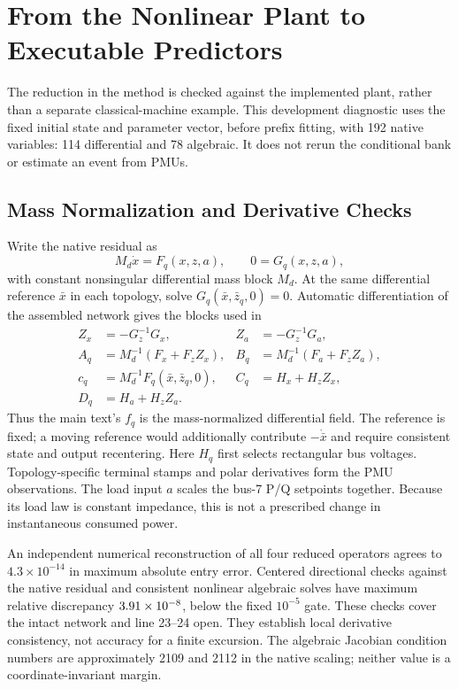 \section{From the Nonlinear Plant to Executable Predictors}
\label{app:descriptor-bridge}


The reduction in the method is checked against the implemented plant,
rather than a separate classical-machine example. This development
diagnostic uses the fixed initial state and parameter vector, before
prefix fitting, with 192 native variables: 114 differential and 78 algebraic.
It does not rerun the conditional bank or estimate an event from PMUs.

\subsection{Mass Normalization and Derivative Checks}
Write the native residual as
\begin{equation}
 M_d\dot x=F_q(x,z,a),\qquad 0=G_q(x,z,a),
\end{equation}
with constant nonsingular differential mass block $M_d$. At the same
differential reference $\bar x$ in each topology, solve
$G_q(\bar x,\bar z_q,0)=0$. Automatic differentiation of the assembled
network gives the blocks used in
\begin{align}
 Z_x&=-G_z^{-1}G_x,&Z_a&=-G_z^{-1}G_a,\nonumber\\
 A_q&=M_d^{-1}(F_x+F_zZ_x),&
 B_q&=M_d^{-1}(F_a+F_zZ_a),\nonumber\\
 c_q&=M_d^{-1}F_q(\bar x,\bar z_q,0),&
 C_q&=H_x+H_zZ_x,\nonumber\\
 D_q&=H_a+H_zZ_a.
\end{align}
Thus the main text's $f_q$ is the mass-normalized differential field.
The reference is fixed; a moving reference would additionally contribute
$-\dot{\bar x}$ and require consistent state and output recentering.
Here $H_q$ first selects rectangular bus voltages. Topology-specific
terminal stamps and polar derivatives form the PMU observations.
The load input $a$ scales the bus-7 P/Q setpoints together. Because its
load law is constant impedance, this is not a prescribed change in
instantaneous consumed power.

An independent numerical reconstruction of all four reduced operators
agrees to $4.3\times10^{-14}$ in maximum absolute entry error.
Centered directional checks against the native residual and consistent
nonlinear algebraic solves have maximum relative discrepancy
$3.91\times10^{-8}{}$, below the fixed $10^{-5}$ gate. These checks
cover the intact network and line 23--24 open. They establish local
derivative consistency, not accuracy for a finite excursion.
The algebraic Jacobian condition numbers are approximately 2109 and 2112
in the native scaling; neither value is a coordinate-invariant margin.

